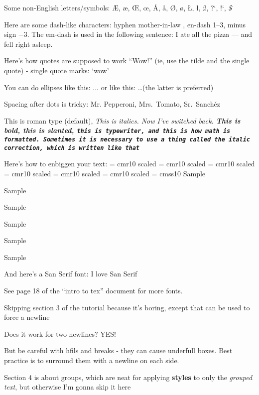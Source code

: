 Some non-English letters/symbols:
\AE, \ae, \OE, \oe, \AA, \aa, \O, \o, \L, \l, \ss, ?`, !`, {\it\$}

Here are some dash-like characters: hyphen mother-in-law , en-dash 1--3, minus sign $-$3. The em-dash is used in the following sentence:
I ate all the pizza --- and fell right asleep.

Here's how quotes are supposed to work ``Wow!'' (ie, use the tilde and the
single quote) - single quote marks: `wow'

You can do ellipses like this: ... or like this: \dots (the latter is
preferred)

Spacing after dots is tricky: Mr. Pepperoni, Mrs.\ Tomato, Sr.~Sanch\'ez
\par
This is roman type (default), \it This is italics. \rm Now I've switched back.
\bf This is bold, \sl this is slanted, \tt this is typewriter, \rm and \cal
this is how math is formatted. \it Sometimes it is necessary to use a thing
called the italic correction, which is written \/ like that

\rm Here's how to enbiggen your text:
\font\rmonehalf = cmr10 scaled \magstephalf
\font\rmone = cmr10 scaled 
\font\rmtwo = cmr10 scaled 
\font\rmthree = cmr10 scaled 
\font\rmfour = cmr10 scaled 
\font\rmfive = cmr10 scaled 
\font\sf = cmss10  %
\rmonehalf Sample

\rmone Sample

\rmtwo Sample

\rmthree Sample

\rmfour Sample

\rmfive Sample 
\par
\eject \vfill %
\rm And here's a San Serif font:
\sf I love San Serif

\rm See page 18 of the ``intro to tex'' document for more fonts.
 
Skipping section 3 of the tutorial because it's boring, except that \hfil \break
can be used to force a newline

\hfil \break 
Does it work for two newlines? YES!

But be careful with hfils and breaks - they can cause underfull boxes. Best
practice is to surround them with a newline on each side.

\hfil \break
Section 4 is about groups, which are neat for
applying {\bf styles} to only the {\it grouped text}, but otherwise I'm gonna skip it
here

